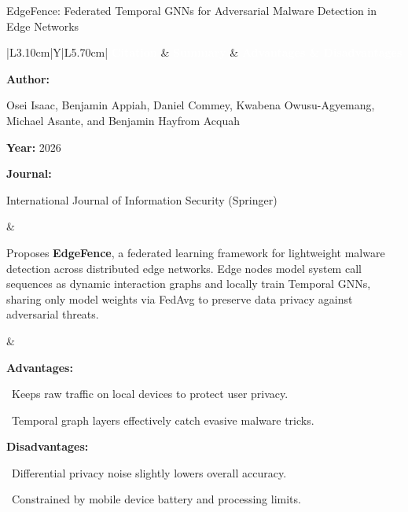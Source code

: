 \documentclass[aspectratio=169,10pt]{beamer}
\newcommand{\lrhdr}{%
  \rowcolor{prismNavy}%
  {\scriptsize\textcolor{white}{\textbf{Citation}}} &
  {\scriptsize\textcolor{white}{\textbf{Summary}}} &
  {\scriptsize\textcolor{white}{\textbf{Advantages \& Disadvantages}}} \\}
\begin{document}
\begin{frame}[t]{EdgeFence: Federated Temporal GNNs for Adversarial Malware Detection in Edge Networks}
\vspace{-0.30em}
{\footnotesize\setlength{\tabcolsep}{3.5pt}\renewcommand{\arraystretch}{1.10}
\begin{tabularx}{\textwidth}{|L{3.10cm}|Y|L{5.70cm}|}
\hline\lrhdr\hline
\begin{minipage}[t]{\linewidth}\fontsize{7.2pt}{9.2pt}\raggedright\selectfont
\textbf{Author:}\par
Osei Isaac, Benjamin Appiah, Daniel Commey, Kwabena Owusu-Agyemang, Michael Asante, and Benjamin Hayfrom Acquah\par\vspace{4pt}
\textbf{Year:} 2026\par\vspace{4pt}
\textbf{Journal:}\par
International Journal of Information Security (Springer)\par\vspace{4pt}
\end{minipage}
&
\begin{minipage}[t]{\linewidth}\fontsize{7.2pt}{9.2pt}\raggedright\selectfont
Proposes \textbf{EdgeFence}, a federated learning framework for lightweight malware detection across distributed edge networks. Edge nodes model system call sequences as dynamic interaction graphs and locally train Temporal GNNs, sharing only model weights via FedAvg to preserve data privacy against adversarial threats.\par\vspace{4pt}
\end{minipage}
&
\begin{minipage}[t]{\linewidth}\fontsize{7.2pt}{9.0pt}\raggedright\selectfont
\textcolor{strengthGreen}{\textbf{Advantages:}}\par\vspace{1.5pt}
\textbullet~Keeps raw traffic on local devices to protect user privacy.\par\vspace{2.0pt}\textbullet~Temporal graph layers effectively catch evasive malware tricks.\par\vspace{4.0pt}
\textcolor{limitRed}{\textbf{Disadvantages:}}\par\vspace{1.5pt}
\textbullet~Differential privacy noise slightly lowers overall accuracy.\par\vspace{2.0pt}\textbullet~Constrained by mobile device battery and processing limits.\par\vspace{4pt}
\end{minipage} \\\hline
\end{tabularx}}
\end{frame}
\end{document}
